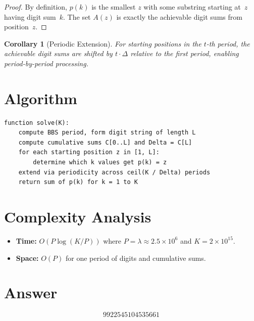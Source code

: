 \documentclass[12pt]{article}
\newtheorem{corollary}[theorem]{Corollary}
\begin{document}
\begin{proof}
By definition, $p(k)$ is the smallest $z$ with some substring starting at~$z$ having digit sum~$k$. The set $A(z)$ is exactly the achievable digit sums from position~$z$.
\end{proof}

\begin{corollary}[Periodic Extension]
For starting positions in the $t$-th period, the achievable digit sums are shifted by $t \cdot \Delta$ relative to the first period, enabling period-by-period processing.
\end{corollary}

\section{Algorithm}

\begin{verbatim}
function solve(K):
    compute BBS period, form digit string of length L
    compute cumulative sums C[0..L] and Delta = C[L]
    for each starting position z in [1, L]:
        determine which k values get p(k) = z
    extend via periodicity across ceil(K / Delta) periods
    return sum of p(k) for k = 1 to K
\end{verbatim}

\section{Complexity Analysis}
\begin{itemize}
    \item \textbf{Time:} $O(P \log(K/P))$ where $P = \lambda \approx 2.5 \times 10^6$ and $K = 2 \times 10^{15}$.
    \item \textbf{Space:} $O(P)$ for one period of digits and cumulative sums.
\end{itemize}

\section{Answer}

\[
\boxed{9922545104535661}
\]
\end{document}
